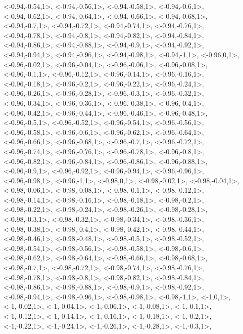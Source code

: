 \documentclass[a4paper,10pt]{article}
\begin{document}
\begin{eulernotebook}
\begin{euleroutput}
  <-0.94,-0.54,1>,
  <-0.94,-0.56,1>,
  <-0.94,-0.58,1>,
  <-0.94,-0.6,1>,
  <-0.94,-0.62,1>,
  <-0.94,-0.64,1>,
  <-0.94,-0.66,1>,
  <-0.94,-0.68,1>,
  <-0.94,-0.7,1>,
  <-0.94,-0.72,1>,
  <-0.94,-0.74,1>,
  <-0.94,-0.76,1>,
  <-0.94,-0.78,1>,
  <-0.94,-0.8,1>,
  <-0.94,-0.82,1>,
  <-0.94,-0.84,1>,
  <-0.94,-0.86,1>,
  <-0.94,-0.88,1>,
  <-0.94,-0.9,1>,
  <-0.94,-0.92,1>,
  <-0.94,-0.94,1>,
  <-0.94,-0.96,1>,
  <-0.94,-0.98,1>,
  <-0.94,-1,1>,
  <-0.96,0,1>,
  <-0.96,-0.02,1>,
  <-0.96,-0.04,1>,
  <-0.96,-0.06,1>,
  <-0.96,-0.08,1>,
  <-0.96,-0.1,1>,
  <-0.96,-0.12,1>,
  <-0.96,-0.14,1>,
  <-0.96,-0.16,1>,
  <-0.96,-0.18,1>,
  <-0.96,-0.2,1>,
  <-0.96,-0.22,1>,
  <-0.96,-0.24,1>,
  <-0.96,-0.26,1>,
  <-0.96,-0.28,1>,
  <-0.96,-0.3,1>,
  <-0.96,-0.32,1>,
  <-0.96,-0.34,1>,
  <-0.96,-0.36,1>,
  <-0.96,-0.38,1>,
  <-0.96,-0.4,1>,
  <-0.96,-0.42,1>,
  <-0.96,-0.44,1>,
  <-0.96,-0.46,1>,
  <-0.96,-0.48,1>,
  <-0.96,-0.5,1>,
  <-0.96,-0.52,1>,
  <-0.96,-0.54,1>,
  <-0.96,-0.56,1>,
  <-0.96,-0.58,1>,
  <-0.96,-0.6,1>,
  <-0.96,-0.62,1>,
  <-0.96,-0.64,1>,
  <-0.96,-0.66,1>,
  <-0.96,-0.68,1>,
  <-0.96,-0.7,1>,
  <-0.96,-0.72,1>,
  <-0.96,-0.74,1>,
  <-0.96,-0.76,1>,
  <-0.96,-0.78,1>,
  <-0.96,-0.8,1>,
  <-0.96,-0.82,1>,
  <-0.96,-0.84,1>,
  <-0.96,-0.86,1>,
  <-0.96,-0.88,1>,
  <-0.96,-0.9,1>,
  <-0.96,-0.92,1>,
  <-0.96,-0.94,1>,
  <-0.96,-0.96,1>,
  <-0.96,-0.98,1>,
  <-0.96,-1,1>,
  <-0.98,0,1>,
  <-0.98,-0.02,1>,
  <-0.98,-0.04,1>,
  <-0.98,-0.06,1>,
  <-0.98,-0.08,1>,
  <-0.98,-0.1,1>,
  <-0.98,-0.12,1>,
  <-0.98,-0.14,1>,
  <-0.98,-0.16,1>,
  <-0.98,-0.18,1>,
  <-0.98,-0.2,1>,
  <-0.98,-0.22,1>,
  <-0.98,-0.24,1>,
  <-0.98,-0.26,1>,
  <-0.98,-0.28,1>,
  <-0.98,-0.3,1>,
  <-0.98,-0.32,1>,
  <-0.98,-0.34,1>,
  <-0.98,-0.36,1>,
  <-0.98,-0.38,1>,
  <-0.98,-0.4,1>,
  <-0.98,-0.42,1>,
  <-0.98,-0.44,1>,
  <-0.98,-0.46,1>,
  <-0.98,-0.48,1>,
  <-0.98,-0.5,1>,
  <-0.98,-0.52,1>,
  <-0.98,-0.54,1>,
  <-0.98,-0.56,1>,
  <-0.98,-0.58,1>,
  <-0.98,-0.6,1>,
  <-0.98,-0.62,1>,
  <-0.98,-0.64,1>,
  <-0.98,-0.66,1>,
  <-0.98,-0.68,1>,
  <-0.98,-0.7,1>,
  <-0.98,-0.72,1>,
  <-0.98,-0.74,1>,
  <-0.98,-0.76,1>,
  <-0.98,-0.78,1>,
  <-0.98,-0.8,1>,
  <-0.98,-0.82,1>,
  <-0.98,-0.84,1>,
  <-0.98,-0.86,1>,
  <-0.98,-0.88,1>,
  <-0.98,-0.9,1>,
  <-0.98,-0.92,1>,
  <-0.98,-0.94,1>,
  <-0.98,-0.96,1>,
  <-0.98,-0.98,1>,
  <-0.98,-1,1>,
  <-1,0,1>,
  <-1,-0.02,1>,
  <-1,-0.04,1>,
  <-1,-0.06,1>,
  <-1,-0.08,1>,
  <-1,-0.1,1>,
  <-1,-0.12,1>,
  <-1,-0.14,1>,
  <-1,-0.16,1>,
  <-1,-0.18,1>,
  <-1,-0.2,1>,
  <-1,-0.22,1>,
  <-1,-0.24,1>,
  <-1,-0.26,1>,
  <-1,-0.28,1>,
  <-1,-0.3,1>,

\end{euleroutput}
\end{eulernotebook}
\end{document}
